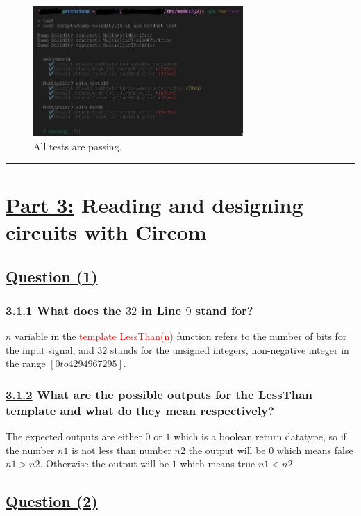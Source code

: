 \documentclass[letterpaper, 10 pt, conference]{ieeeconf}  %
\begin{document}
\begin{figure}[htp]
    \centering
    \includegraphics[width=8cm]{photo_2022-07-10_09-51-06}
    \caption{All tests are passing.}
    \label{fig:galaxy}
\end{figure}

\noindent\rule{8cm}{0.4pt}




\section{\textbf{\underline{Part 3:}} Reading and designing circuits with Circom}

\subsection{\textbf{}\underline{Question (1)}}
\subsubsection{\textbf{\underline{3.1.1} What does the $32$ in Line $9$ stand for?}}

$n$ variable in the \textcolor{red}{template LessThan(n)} function refers to the number of bits for the input signal, and $32$ stands for the unsigned integers, non-negative integer in the range $[0 to 4294967295]$.

\subsubsection{\textbf{\underline{3.1.2} What are the possible outputs for the LessThan template and what do they mean respectively?}}

The expected outputs are either $0$ or $1$ which is a boolean return datatype, so if the number $n1$ is not less than number $n2$ the output will be $0$ which means false $n1 > n2$. Otherwise the output will be $1$ which means true $n1 < n2$.

\subsection{\textbf{\underline{Question (2)}}}
\end{document}
